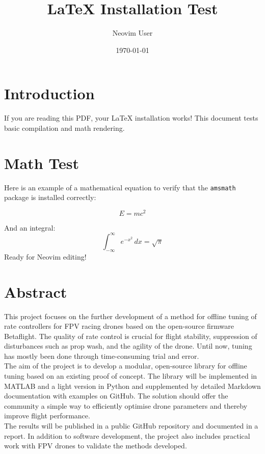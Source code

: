 \documentclass{article}
\title{LaTeX Installation Test}
\author{Neovim User}
\date{\today}
\begin{document}
\maketitle

\section{Introduction}
If you are reading this PDF, your \LaTeX{} installation works!
This document tests basic compilation and math rendering.

\section{Math Test}
Here is an example of a mathematical equation to verify that the \texttt{amsmath} package is installed correctly:

\begin{equation}
	E = mc^2
\end{equation}

And an integral:
\[
	\int_{-\infty}^{\infty} e^{-x^2} \, dx = \sqrt{\pi}
\]
Ready for Neovim editing!

\newpage

\section{Abstract}
This project focuses on the further development of a method for offline tuning of rate controllers for FPV racing drones based on the open-source firmware Betaflight. The quality of rate control is crucial for flight stability, suppression of disturbances such as prop wash, and the agility of the drone. Until now, tuning has mostly been done through time-consuming trial and error.\\
The aim of the project is to develop a modular, open-source library for offline tuning based on an existing proof of concept. The library will be implemented in MATLAB and a light version in Python and supplemented by detailed Markdown documentation with examples on GitHub. The solution should offer the community a simple way to efficiently optimise drone parameters and thereby improve flight performance.\\
The results will be published in a public GitHub repository and documented in a report. In addition to software development, the project also includes practical work with FPV drones to validate the methods developed.
\end{document}
